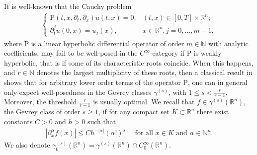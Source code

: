 \documentclass{article}
\def\R{\mathbb{R}}
\def\C{\mathbb{C}}
\def\N{\mathbb{N}}
\begin{document}
It is  well-known that the Cauchy problem
\begin{align}
  \label{eq:CP}
  \begin{cases}
    \mathrm{P}(t,x,\partial_{t},\partial_{x})u(t,x)=0,& (t,x)\in[0,T]\times \R^{n};\\
    \partial_{t}^{j}u(0,x)=u_{j}(x),& x\in\R^{n},j=0, \ldots, m-1,
  \end{cases}
\end{align}
where $\mathrm{P}$ is a linear hyperbolic differential operator of order $ m\in\mathbb{N}
$ with analytic coefficients, may fail to be
well-posed in the $C^{\infty}$-category if $\mathrm{P}$ is weakly
hyperbolic, that is if some of its characteristic roots coincide. When
this happens, and $ r\in\mathbb{N}$ denotes the largest multiplicity of these roots,
then a classical result in \cite{BroGevrey} shows that for arbitrary
lower order terms of the operator $\mathrm{P}$, one can in general only
expect well-posedness in the Gevrey classes $\gamma^{(s)}$, with $ 1
\leq s < \frac{r}{r-1} $. Moreover, the threshold $ \frac{r}{r-1} $ is usually optimal.
We recall that  $f\in\gamma^{(s)}\left(\R^{n}\right)$, the Gevrey class of order $s\geq 1$, if for any compact set $K \subset \R^{n}$ there exist constants $C>0$ and $h>0$ such that
\begin{align*}
\left|\partial_{x}^{\alpha} f(x)\right| \leq C h^{-|\alpha|}(\alpha!)^{s}\quad\mbox{ for all }x \in K\mbox{ and }\alpha \in \N^{n}.
\end{align*}
We also denote $ \gamma^{(s)}_{0}(\R^n) = \gamma^{(s)}(\R^n) \cap C_{0}^{\infty}(\R^n)$.
\end{document}
